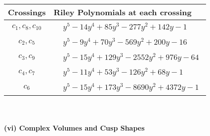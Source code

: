 \documentclass[1p]{elsarticle_modified}
\theoremstyle{definition}
\begin{document}
\begin{tabular}{m{50pt}|m{274pt}}
Crossings & \hspace{64pt}Riley Polynomials at each crossing \\
\hline $$\begin{aligned}c_{1},c_{8},c_{10}\end{aligned}$$&$\begin{aligned}
&y^5-14 y^4+85 y^3-277 y^2+142 y-1
\end{aligned}$\\
\hline $$\begin{aligned}c_{2},c_{5}\end{aligned}$$&$\begin{aligned}
&y^5-9 y^4+70 y^3-569 y^2+200 y-16
\end{aligned}$\\
\hline $$\begin{aligned}c_{3},c_{9}\end{aligned}$$&$\begin{aligned}
&y^5-15 y^4+129 y^3-2552 y^2+976 y-64
\end{aligned}$\\
\hline $$\begin{aligned}c_{4},c_{7}\end{aligned}$$&$\begin{aligned}
&y^5-11 y^4+53 y^3-126 y^2+68 y-1
\end{aligned}$\\
\hline $$\begin{aligned}c_{6}\end{aligned}$$&$\begin{aligned}
&y^5-15 y^4+173 y^3-8690 y^2+4372 y-1
\end{aligned}$\\
\hline
\end{tabular}\\~\\
\newpage\flushleft \textbf{(vi) Complex Volumes and Cusp Shapes}
\end{document}
